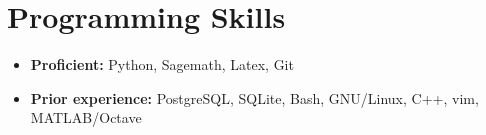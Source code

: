 \documentclass[letterpaper,11pt]{article}
\newcommand{\resumeSubHeadingListStart}{\begin{itemize}[leftmargin=*]}
\newcommand{\resumeSubHeadingListEnd}{\end{itemize}}
\begin{document}
\section{Programming Skills}
  \resumeSubHeadingListStart
    \item{
            \textbf{Proficient: }{Python, Sagemath, Latex, Git}
    }
    \item{
            \textbf{Prior experience: }{PostgreSQL, SQLite, Bash, GNU/Linux,
            C++, vim, MATLAB/Octave}
    }
  \resumeSubHeadingListEnd


\end{document}
